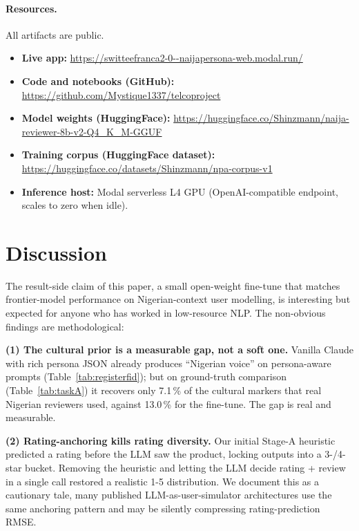 \documentclass[sigconf,nonacm,balance]{acmart}
\begin{document}
\paragraph{Resources.} All artifacts are public.
\begin{itemize}[leftmargin=*,nosep]
  \item \textbf{Live app:} \url{https://switteefranca2-0--naijapersona-web.modal.run/}
  \item \textbf{Code and notebooks (GitHub):}
        \url{https://github.com/Mystique1337/telcoproject}
  \item \textbf{Model weights (HuggingFace):}
        \url{https://huggingface.co/Shinzmann/naija-reviewer-8b-v2-Q4_K_M-GGUF}
  \item \textbf{Training corpus (HuggingFace dataset):}
        \url{https://huggingface.co/datasets/Shinzmann/npa-corpus-v1}
  \item \textbf{Inference host:} Modal serverless L4 GPU (OpenAI-compatible
        endpoint, scales to zero when idle).
\end{itemize}

\section{Discussion}
\label{sec:discussion}

The result-side claim of this paper, a small open-weight fine-tune
that matches frontier-model performance on Nigerian-context user
modelling, is interesting but expected for anyone who has worked in
low-resource NLP. The non-obvious findings are methodological:

\textbf{(1) The cultural prior is a measurable gap, not a soft one.}
Vanilla Claude with rich persona JSON already produces ``Nigerian
voice'' on persona-aware prompts (Table~\ref{tab:registerfid}); but on
ground-truth comparison (Table~\ref{tab:taskA}) it recovers only
7.1\,\% of the cultural markers that real Nigerian reviewers used,
against 13.0\,\% for the fine-tune. The gap is real and measurable.

\textbf{(2) Rating-anchoring kills rating diversity.} Our initial
Stage-A heuristic predicted a rating before the LLM saw the product,
locking outputs into a 3-/4-star bucket. Removing the heuristic and
letting the LLM decide rating + review in a single call restored a
realistic 1-5 distribution. We document this as a cautionary tale,
many published LLM-as-user-simulator architectures use the same
anchoring pattern and may be silently compressing rating-prediction
RMSE.
\end{document}
